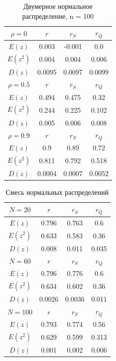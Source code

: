 \begin{table}[H]
	\centering
	\begin{tabular}{| c | c | c | c |}
		
		\hline
		$\rho = 0$ & $r$      & $r_S$  & $r_Q$ \\
		\hline
		$E(z)$    & 0.003 & -0.001 & 0.0   \\
        $E(z^{2})$  & 0.004 & 0.004 & 0.006 \\
        $D(z)$    & 0.0095 & 0.0097 & 0.0099 \\
		\hline
		$\rho = 0.5$ & $r$      & $r_S$  & $r_Q$ \\
		\hline
		$E(z)$      & 0.494 & 0.475 & 0.32  \\
        $E(z^{2})$    & 0.244 & 0.225 & 0.102 \\
        $D(z)$      & 0.005 & 0.006 & 0.008 \\
		\hline
		$\rho = 0.9$ & $r$      & $r_S$  & $r_Q$ \\
		\hline
		$E(z)$      & 0.9 & 0.89 & 0.72  \\
        $E(z^{2})$    & 0.811 & 0.792 & 0.518 \\
        $D(z)$      & 0.0004 & 0.0007 & 0.0052 \\
		\hline
		
	\end{tabular}{}
	\caption{Двумерное нормальное распределение, n = 100}
	\label{tab:n100}
\end{table}


\begin{table}[H]
	\centering
	\begin{tabular}{| c | c | c | c |}
		
		\hline
		$N = 20$ & $r$      & $r_{S}$ & $r_{Q}$ \\
		\hline
		$E(z)$      & 0.796 & 0.763 & 0.6   \\
        $E(z^{2})$     & 0.633 & 0.583 & 0.36 \\
        $D(z)$      & 0.008 & 0.011 & 0.035 \\
		\hline
		$N = 60$ & $r$      & $r_{S}$ & $r_{Q}$ \\
		\hline
		$E(z)$      & 0.796 & 0.776 & 0.6   \\
        $E(z^{2})$    & 0.634 & 0.602 & 0.36  \\
        $D(z)$      & 0.0026 & 0.0036 & 0.011 \\
		\hline
		$N = 100$ & $r$      & $r_{S}$ & $r_{Q}$ \\
		\hline
		$E(z)$       & 0.793 & 0.774 & 0.56   \\
        $E(z^{2})$     & 0.629 & 0.599 & 0.313  \\
        $D(z)$      & 0.001 & 0.002 & 0.006 \\
		\hline
		
	\end{tabular}{}
	\caption{Смесь нормальных распределений}
	\label{tab:mix_normal}
\end{table}


